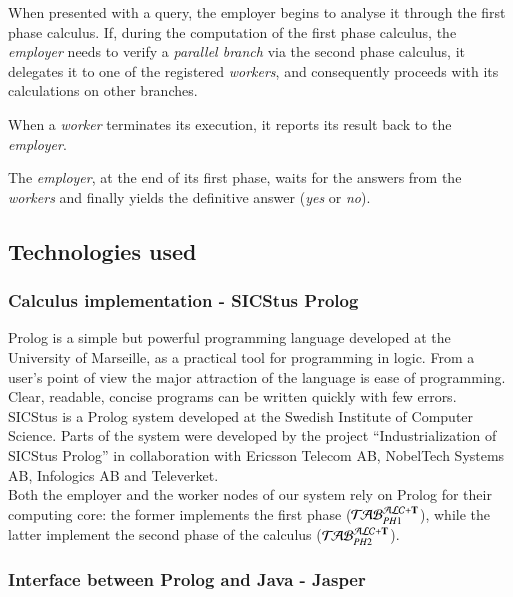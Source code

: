 \documentclass[a4paper, 11pt, oneside]{elsarticle}
\newcommand{\tip}{{\bf T}}
\newcommand{\primo}{\mathrel{{\mathcal{T}\!\mathcal{AB}}}_{PH 1}^{\mathcal{ALC}+\mbox{\scriptsize $\tip$}}}
\newcommand{\secondo}{\mathrel{{\mathcal{T}\!\mathcal{AB}}}_{PH 2}^{\mathcal{ALC}+\mbox{\scriptsize $\tip$}}}
\begin{document}
When presented with a query, the employer begins to analyse it through the first phase calculus.
If, during the computation of the first phase calculus, the \emph{employer} needs to verify a \emph{parallel branch} via the second phase calculus, it delegates it to one of the registered \emph{workers}, and consequently proceeds with its calculations on other branches.

When a \emph{worker} terminates its execution, it reports its result back to the \emph{employer}.

The \emph{employer}, at the end of its first phase, waits for the answers from the \emph{workers} and finally yields the definitive answer (\emph{yes} or \emph{no}).

\newpage

\subsection{Technologies used}


\subsubsection{Calculus implementation - SICStus Prolog}

Prolog is a simple but powerful programming language developed at the University of Marseille, as a practical tool for programming in logic. From a user's point of view the major attraction of the language is ease of programming. Clear, readable, concise programs can be written quickly with few errors.\\

SICStus is a Prolog system developed at the Swedish Institute of Computer Science. Parts of the system were developed by the project “Industrialization of SICStus Prolog” in collaboration with Ericsson Telecom AB, NobelTech Systems AB, Infologics AB and Televerket\cite{sicstus_intro}.\\

Both the employer and the worker nodes of our system rely on Prolog for their computing core: the former implements the first phase ($\primo$), while the latter implement the second phase of the calculus ($\secondo$).


\subsubsection{Interface between Prolog and Java - Jasper}\label{ssec_jasper}
\end{document}
